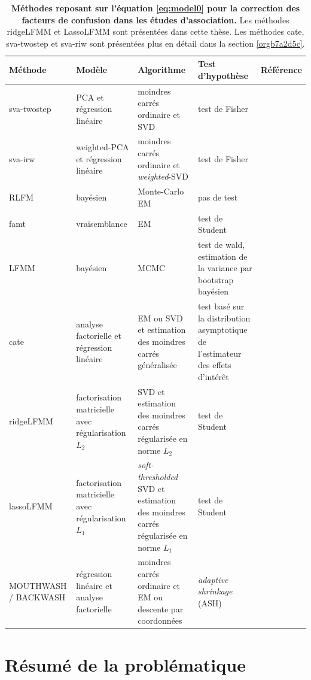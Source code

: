 \documentclass[12pt,a4paper,twoside]{ugathesis}
\begin{document}
\begin{table}
\caption{\label{tab:org773b2d1}
\textbf{Méthodes reposant sur l'équation \ref{eq:model0} pour la correction des facteurs de confusion dans les études d'association.} Les méthodes ridgeLFMM et LassoLFMM sont présentées dans cette thèse. Les méthodes cate, sva-twostep et sva-riw sont présentées plus en détail dans la section \ref{orgb7a2d5c}.}
\centering
\begin{tabular}{p{3cm}|p{4.2cm}p{4cm}p{5cm}|p{4cm}}
\hline
Méthode & Modèle & Algorithme & Test d'hypothèse & Référence\\
\hline
sva-twostep & PCA et régression linéaire & moindres carrés ordinaire et SVD & test de Fisher & \citet{article_Leek_Storey_2007}\\
sva-irw & weighted-PCA et régression linéaire & moindres carrés ordinaire et \emph{weighted}-SVD & test de Fisher & \citet{article_Leek_Storey_2008}\\
RLFM & bayésien & Monte-Carlo EM & pas de test & \citet{agarwal09_regres}\\
famt & vraisemblance & EM & test de Student & \citet{friguet09_factor_model_approac_to_multip}\\
LFMM & bayésien & MCMC & test de wald, estimation de la variance par bootstrap bayésien & \citet{Frichot_2013}\\
cate & analyse factorielle et régression linéaire & EM ou SVD et estimation des moindres carrés généralisée & test basé sur la distribution asymptotique de l'estimateur des effets d'intérêt & \citet{wang2015confounder}\\
ridgeLFMM & factorisation matricielle avec régularisation \(L_{2}\) & SVD et estimation des moindres carrés régularisée en norme \(L_{2}\) & test de Student & \\
lassoLFMM & factorisation matricielle avec régularisation \(L_{1}\) & \emph{soft-thresholded} SVD et estimation des moindres carrés régularisée en norme \(L_{1}\) & test de Student & \\
MOUTHWASH / BACKWASH & régression linéaire et analyse factorielle & moindres carrés ordinaire et EM ou descente par coordonnées & \emph{adaptive shrinkage} (ASH) \citep{stephens16_false_discov_rates} & \citet{gerard2017empirical}\\
\end{tabular}
\end{table}

\section{Résumé de la problématique}
\label{sec:orgd309411}
\end{document}
